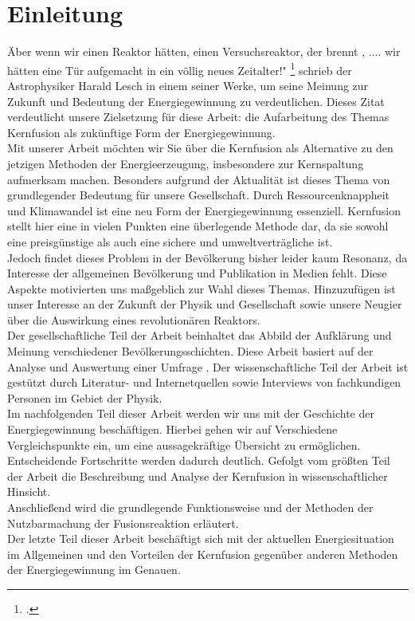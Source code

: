 \section{Einleitung}
\" Aber wenn wir einen Reaktor hätten, einen Versuchsreaktor, der brennt , .... wir hätten eine Tür aufgemacht in ein völlig neues Zeitalter!" \footcite{LeschH} schrieb der Astrophysiker Harald Lesch in einem seiner Werke, um seine Meinung zur Zukunft und Bedeutung der Energiegewinnung zu verdeutlichen. Dieses Zitat verdeutlicht unsere Zielsetzung für diese Arbeit: die Aufarbeitung des Themas Kernfusion als zukünftige Form der Energiegewinnung.\\
Mit unserer Arbeit möchten wir Sie über die Kernfusion als Alternative zu den jetzigen Methoden der Energieerzeugung, insbesondere zur Kernspaltung aufmerksam machen. Besonders aufgrund der Aktualität ist dieses Thema von grundlegender Bedeutung für unsere Gesellschaft. Durch Ressourcenknappheit und Klimawandel ist eine neu Form der Energiegewinnung essenziell. Kernfusion stellt hier eine in vielen Punkten eine überlegende Methode dar, da sie sowohl eine preisgünstige als auch eine sichere und umweltverträgliche ist. \\
Jedoch findet dieses Problem in der Bevölkerung bisher leider kaum Resonanz, da Interesse der allgemeinen Bevölkerung und Publikation in Medien fehlt. Diese Aspekte motivierten uns maßgeblich zur Wahl dieses Themas. Hinzuzufügen ist unser Interesse an der Zukunft der Physik und Gesellschaft sowie unsere Neugier über die Auswirkung eines revolutionären Reaktors.\\ 
Der gesellschaftliche Teil der Arbeit beinhaltet das Abbild der Aufklärung und Meinung verschiedener Bevölkerungsschichten. Diese Arbeit basiert auf der Analyse und Auswertung einer Umfrage . Der wissenschaftliche Teil der Arbeit ist gestützt durch Literatur- und Internetquellen sowie Interviews von fachkundigen Personen im Gebiet der Physik.\\
Im nachfolgenden Teil dieser Arbeit werden wir uns mit der Geschichte der Energiegewinnung beschäftigen. Hierbei gehen wir auf Verschiedene Vergleichspunkte ein, um eine aussagekräftige Übersicht zu ermöglichen. Entscheidende Fortschritte werden dadurch deutlich. Gefolgt vom größten Teil der Arbeit die Beschreibung und Analyse der Kernfusion in wissenschaftlicher Hinsicht.\\
Anschließend wird die grundlegende Funktionsweise und der Methoden der Nutzbarmachung der Fusionsreaktion erläutert.\\
Der letzte Teil dieser Arbeit beschäftigt sich mit der aktuellen Energiesituation im Allgemeinen und den Vorteilen der Kernfusion gegenüber anderen Methoden der Energiegewinnung im Genauen.\\

